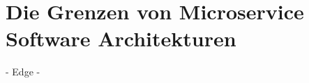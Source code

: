 \newpage
\section{Die Grenzen von Microservice Software Architekturen} \label{wann-nicht-msa}

- Edge
- 
